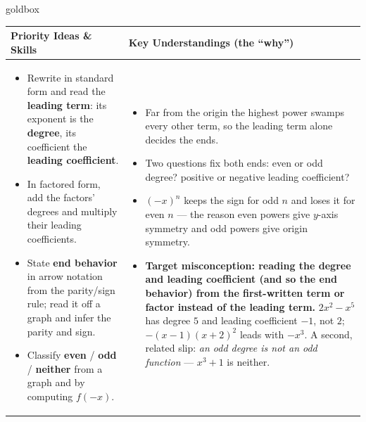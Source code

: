 \documentclass[10pt]{article}
\begin{document}
\renewcommand{\arraystretch}{1.4}
\begin{skillbox}{goldbox}
\begin{tabularx}{\linewidth}{@{}X|X@{}}
\textbf{Priority Ideas \& Skills} & \textbf{Key Understandings (the ``why'')} \\[2pt]
\hline
\vspace{-6pt}
\begin{itemize}[leftmargin=1.1em, nosep, after=\vspace{2pt}]
  \item Rewrite in standard form and read the \textbf{leading term}: its exponent is the
        \textbf{degree}, its coefficient the \textbf{leading coefficient}.
  \item In factored form, add the factors' degrees and multiply their leading coefficients.
  \item State \textbf{end behavior} in arrow notation from the parity/sign rule; read it off a
        graph and infer the parity and sign.
  \item Classify \textbf{even} / \textbf{odd} / \textbf{neither} from a graph and by computing
        $f(-x)$.
\end{itemize}
&
\vspace{-6pt}
\begin{itemize}[leftmargin=1.1em, nosep, after=\vspace{2pt}]
  \item Far from the origin the highest power swamps every other term, so the leading term
        alone decides the ends.
  \item Two questions fix both ends: even or odd degree? positive or negative leading
        coefficient?
  \item $(-x)^n$ keeps the sign for odd $n$ and loses it for even $n$ --- the reason even powers
        give $y$-axis symmetry and odd powers give origin symmetry.
  \item \textbf{Target misconception: reading the degree and leading coefficient (and so the end
        behavior) from the first-written term or factor instead of the leading term.}
        $2x^2-x^5$ has degree $5$ and leading coefficient $-1$, not $2$;
        $-(x-1)(x+2)^2$ leads with $-x^3$. A second, related slip: \emph{an odd degree is not
        an odd function} --- $x^3+1$ is neither.
\end{itemize}
\end{tabularx}
\end{skillbox}
\end{document}
